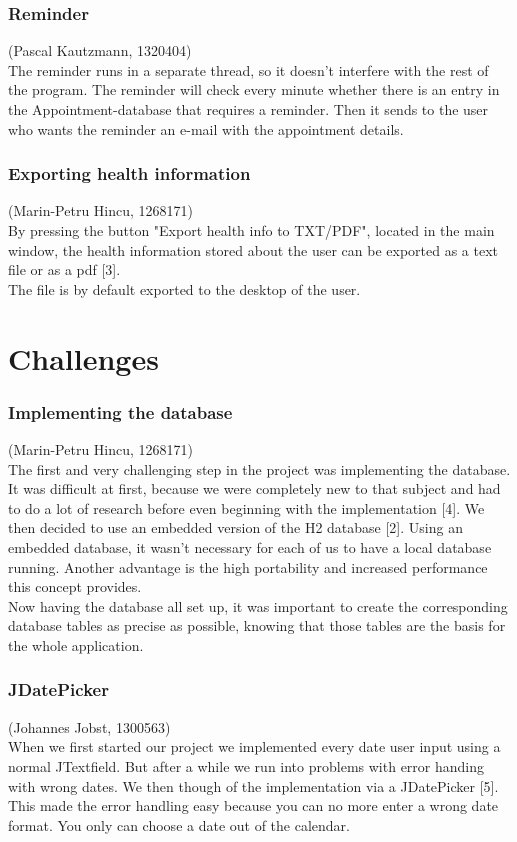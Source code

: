 \documentclass[a4paper, 12pt]{report}
\begin{document}
\subsection{Reminder}
{\tiny (Pascal Kautzmann, 1320404)\\}
The reminder runs in a separate thread, so it doesn't interfere with the rest of the program.
The reminder will check every minute whether there is an entry in the Appointment-database that requires a reminder. 
Then it sends to the user who wants the reminder an e-mail with the appointment details.

\subsection{Exporting health information}
{\tiny (Marin-Petru Hincu, 1268171)\\}
By pressing the button "Export health info to TXT/PDF", located in the main window, the health information stored about the user can be exported as a text file or as a pdf [3].\\ The file is by default exported to the desktop of the user.

\chapter{Challenges}
\subsection{Implementing the database}
{\tiny (Marin-Petru Hincu, 1268171)\\}
The first and very challenging step in the project was implementing the database. It was difficult at first, because we were completely new to that subject and had to do a lot of research before even beginning with the implementation [4]. We then decided to use an embedded version of the H2 database [2].
Using an embedded database, it wasn't necessary for each of us to have a local database running. Another advantage is the high portability and increased performance this concept provides.\\
Now having the database all set up, it was important to create the corresponding database tables as precise as possible, knowing that those tables are the basis for the whole application. \\

\subsection{JDatePicker}
{\tiny (Johannes Jobst, 1300563)\\}
When we first started our project we implemented every date user input using a normal JTextfield. But after a while we run into problems with error handing with wrong dates. We then though of the implementation via a JDatePicker [5]. This made the error handling easy because you can no more enter a wrong date format. You only can choose a date out of the calendar.
\end{document}

